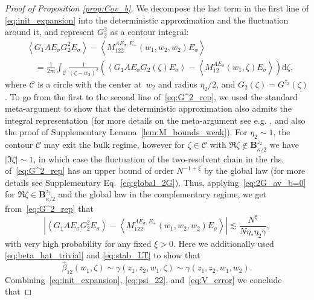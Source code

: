\documentclass[10pt]{amsart}
\numberwithin{equation}{section}
\newcommand{\dif}{\mathrm{d}}
\newcommand{\ii}{\mathrm{i}}
\begin{document}
\begin{proof}[Proof of Proposition \ref{prop:Cov_b}]
We decompose the last term in the first line of \eqref{eq:init_expansion} into the deterministic approximation and the fluctuation around it, and represent $G_2^2$ as a contour integral:
\begin{equation}
\begin{split}
&\left\langle G_1AE_\sigma G_2^2 E_\sigma\right\rangle - \left\langle M_{122}^{AE_\sigma,E_+}(w_1,w_2,w_2)E_\sigma\right\rangle\\
&\quad = \frac{1}{2\pi\ii}\int_\mathscr{C} \frac{1}{(\zeta-w_2)^2} \left(\left\langle G_1AE_\sigma G_2(\zeta) E_\sigma\right\rangle - \left\langle M_{12}^{AE_\sigma}(w_1,\zeta)E_\sigma\right\rangle\right)\dif\zeta,
\end{split}
\label{eq:G^2_rep}
\end{equation}
where $\mathscr{C}$ is a circle with the center at~$w_2$ and radius $\eta_2/2$, and $G_2(\zeta)=G^{z_2}(\zeta)$. To go from the first to the second line of~\eqref{eq:G^2_rep}, we used the standard meta-argument to show that the deterministic approximation also admits the integral representation (for more details on the meta-argument see e.g. \cite[Section~2.6]{Najim16}, \cite[Proof of Lemma~D.1]{non-herm_overlaps} and also the proof of Supplementary Lemma~\ref{lem:M_bounds_weak}). For $\eta_2\sim 1$, the contour $\mathscr{C}$ may exit the bulk regime, however for $\zeta \in\mathscr{C}$ with $\Re\zeta\notin \mathbf{B}_{\kappa/2}^{z_2}$ we have $|\Im\zeta|\sim 1$, in which case the fluctuation of the two-resolvent chain in the rhs. of~\eqref{eq:G^2_rep} has an upper bound of order $N^{-1+\xi}$ by the global law (for more details see Supplementary Eq.~\eqref{eq:global_2G}). Thus, applying~\eqref{eq:2G_av_b=0} for $\Re\zeta\in\mathbf{B}_{\kappa/2}^{z_2}$ and the global law in the complementary regime, we get from~\eqref{eq:G^2_rep} that
\begin{equation}
\left\vert \left\langle G_1AE_\sigma G_2^2 E_\sigma\right\rangle - \left\langle M_{122}^{AE_\sigma,E_+}(w_1,w_2,w_2)E_\sigma\right\rangle\right\vert \lesssim \frac{N^\xi}{N\eta_*\eta_2\gamma}, 
\label{eq:V_error}
\end{equation}
with very high probability for any fixed $\xi>0$. Here we additionally used \eqref{eq:beta_hat_trivial} and \eqref{eq:stab_LT} to show that
\begin{equation*}
\widehat{\beta}_{12}(w_1,\zeta) \sim \gamma(z_1,z_2,w_1,\zeta)\sim\gamma(z_1,z_2,w_1,w_2).
\end{equation*}
Combining~\eqref{eq:init_expansion}, \eqref{eq:psi_22}, and~\eqref{eq:V_error} we conclude that

\end{proof}
\end{document}
